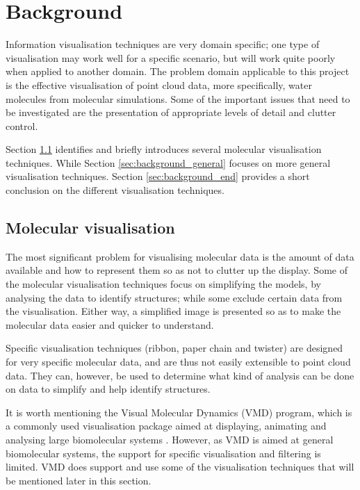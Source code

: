 \graphicspath{{./background/}}

\chapter{Background}
\label{cha:background}


Information visualisation techniques are very domain specific; one type of
visualisation may work well for a specific scenario, but will work quite poorly
when applied to another domain. The problem domain applicable to this project
is the effective visualisation of point cloud data, more specifically, water
molecules from molecular simulations. Some of the important issues that need to
be investigated are the presentation of appropriate levels of detail and
clutter control.

Section \ref{sec:background_molecular} identifies and briefly introduces
several molecular visualisation techniques. While Section
\ref{sec:background_general} focuses on more general visualisation techniques.
Section \ref{sec:background_end} provides a short conclusion on the different
visualisation techniques.


\section{Molecular visualisation}
\label{sec:background_molecular}


The most significant problem for visualising molecular data is the amount of
data available and how to represent them so as not to clutter up the display.
Some of the molecular visualisation techniques focus on simplifying the models,
by analysing the data to identify structures; while some exclude certain data
from the visualisation. Either way, a simplified image is presented so as to
make the molecular data easier and quicker to understand.

Specific visualisation techniques (ribbon, paper chain and twister) are
designed for very specific molecular data, and are thus not easily extensible
to point cloud data. They can, however, be used to determine what kind of
analysis can be done on data to simplify and help identify structures.

It is worth mentioning the Visual Molecular Dynamics (VMD) \citep{humphrey96}
program, which is a commonly used visualisation package aimed at displaying,
animating and analysing large biomolecular systems \citep{VMD}. However, as VMD
is aimed at general biomolecular systems, the support for specific
visualisation and filtering is limited. VMD does support and use some of the
visualisation techniques that will be mentioned later in this section.


